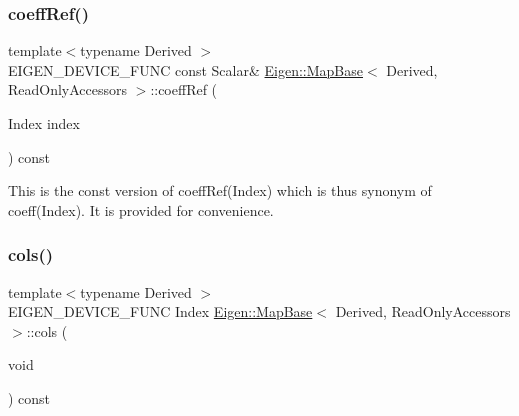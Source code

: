 \subsubsection{\texorpdfstring{coeffRef()}{coeffRef()}\hspace{0.1cm}{\footnotesize\ttfamily [2/2]}}
{\footnotesize\ttfamily template$<$typename Derived $>$ \\
E\+I\+G\+E\+N\+\_\+\+D\+E\+V\+I\+C\+E\+\_\+\+F\+U\+NC const Scalar\& \mbox{\hyperlink{class_eigen_1_1_map_base}{Eigen\+::\+Map\+Base}}$<$ Derived, Read\+Only\+Accessors $>$\+::coeff\+Ref (\begin{DoxyParamCaption}\item[{Index}]{index }\end{DoxyParamCaption}) const\hspace{0.3cm}{\ttfamily [inline]}}





This is the const version of coeff\+Ref(\+Index) which is thus synonym of coeff(\+Index). It is provided for convenience. \mbox{\label{class_eigen_1_1_map_base_3_01_derived_00_01_read_only_accessors_01_4_ad345a6b995b9894e9b076ee174876659}} 
\subsubsection{\texorpdfstring{cols()}{cols()}}
{\footnotesize\ttfamily template$<$typename Derived $>$ \\
E\+I\+G\+E\+N\+\_\+\+D\+E\+V\+I\+C\+E\+\_\+\+F\+U\+NC Index \mbox{\hyperlink{class_eigen_1_1_map_base}{Eigen\+::\+Map\+Base}}$<$ Derived, Read\+Only\+Accessors $>$\+::cols (\begin{DoxyParamCaption}\item[{void}]{ }\end{DoxyParamCaption}) const\hspace{0.3cm}{\ttfamily [inline]}}





\mbox{\label{class_eigen_1_1_map_base_3_01_derived_00_01_read_only_accessors_01_4_ad8c55bd47422cebca456f802c29c451e}} 
